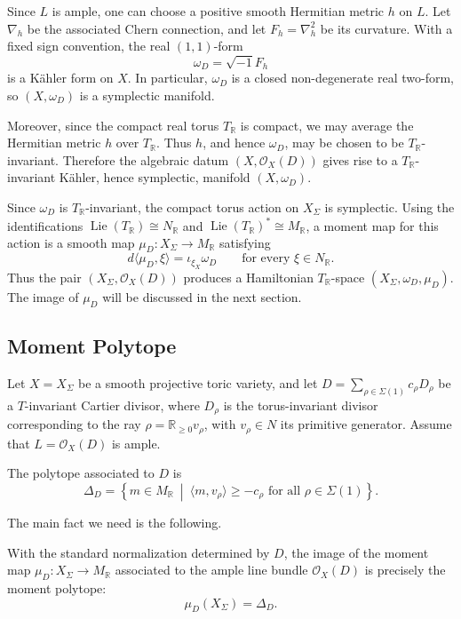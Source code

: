 {Since \(L\) is ample, one can choose a positive smooth Hermitian metric
\(h\) on \(L\).  Let \(\nabla_h\) be the associated Chern connection, and
let \(F_h=\nabla_h^2\) be its curvature.  With a fixed sign convention,
the real \((1,1)\)-form
\[
\omega_D=\sqrt{-1}F_h
\]
is a Kähler form on \(X\).  In particular, \(\omega_D\) is a closed
non-degenerate real two-form, so \((X,\omega_D)\) is a symplectic
manifold.

Moreover, since the compact real torus \(T_{\mathbb R}\) is compact, we
may average the Hermitian metric \(h\) over \(T_{\mathbb R}\).  Thus
\(h\), and hence \(\omega_D\), may be chosen to be
\(T_{\mathbb R}\)-invariant.  Therefore the algebraic datum
\((X,\mathcal O_X(D))\) gives rise to a \(T_{\mathbb R}\)-invariant
Kähler, hence symplectic, manifold \((X,\omega_D)\).

Since \(\omega_D\) is \(T_{\mathbb R}\)-invariant, the compact torus
action on \(X_\Sigma\) is symplectic.  Using the identifications
\(\operatorname{Lie}(T_{\mathbb R})\cong N_{\mathbb R}\) and
\(\operatorname{Lie}(T_{\mathbb R})^*\cong M_{\mathbb R}\), a moment map
for this action is a smooth map \(\mu_D:X_\Sigma\to M_{\mathbb R}\)
satisfying
\[
d\langle \mu_D,\xi\rangle=\iota_{\xi_X}\omega_D
\qquad
\text{for every }\xi\in N_{\mathbb R}.
\]
Thus the pair \((X_\Sigma,\mathcal O_X(D))\) produces a Hamiltonian
\(T_{\mathbb R}\)-space \((X_\Sigma,\omega_D,\mu_D)\).  The image of
\(\mu_D\) will be discussed in the next section.


\subsection{Moment Polytope}

Let \(X=X_\Sigma\) be a smooth projective toric variety, and let
\(D=\sum_{\rho\in\Sigma(1)}c_\rho D_\rho\) be a \(T\)-invariant Cartier
divisor, where \(D_\rho\) is the torus-invariant divisor corresponding
to the ray \(\rho=\mathbb R_{\geq 0}v_\rho\), with \(v_\rho\in N\) its
primitive generator.  Assume that \(L=\mathcal O_X(D)\) is ample.

\begin{definition}
The polytope associated to \(D\) is
\[
\Delta_D
=
\left\{
m\in M_{\mathbb R}
\ \middle|\
\langle m,v_\rho\rangle\geq -c_\rho
\text{ for all }\rho\in\Sigma(1)
\right\}.
\]
\end{definition}

The main fact we need is the following.

\begin{theorem}
With the standard normalization determined by \(D\), the image of the
moment map \(\mu_D:X_\Sigma\to M_{\mathbb R}\) associated to the ample
line bundle \(\mathcal O_X(D)\) is precisely the moment polytope:
\[
\mu_D(X_\Sigma)=\Delta_D.
\]
\end{theorem}

}
